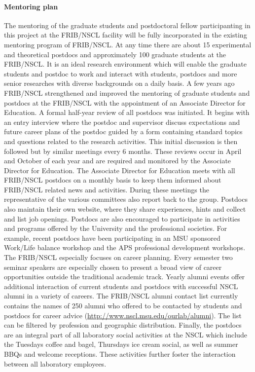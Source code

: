 \documentclass[10pt]{article}
\begin{document}
\paragraph{Mentoring plan}
The mentoring of the graduate students and postdoctoral fellow 
participanting in this project at the 
FRIB/NSCL facility will be fully incorporated in the existing
mentoring program of FRIB/NSCL. At any time there are about 15
experimental and theoretical postdocs and approximately 100 graduate
students at the FRIB/NSCL. It is an ideal research environment which
will enable the graduate students and postdoc to work and interact
with students, postdocs and more senior researches with diverse
backgrounds on a daily basis. A few years ago FRIB/NSCL strengthened
and improved the mentoring of graduate students and postdocs at the
FRIB/NSCL with the appointment of an Associate Director for
Education. A formal half-year review of all postdocs was initiated. It
begins with an entry interview where the postdoc and supervisor
discuss expectations and future career plans of the postdoc guided by
a form containing standard topics and questions related to the
research activities. This initial discussion is then followed but by
similar meetings every 6 months. These reviews occur in April and
October of each year and are required and monitored by the Associate
Director for Education.  The Associate Director for Education meets
with all FRIB/NSCL postdocs on a monthly basis to keep them informed
about FRIB/NSCL related news and activities. During these meetings the
representative of the various committees also report back to the
group. Postdocs also maintain their own website, where they share
experiences, hints and collect and list job openings. Postdocs are
also encouraged to participate in activities and programs offered by
the University and the professional societies. For example, recent
postdocs have been participating in an MSU sponsored Work/Life balance
workshop and the APS professional development workshops. The FRIB/NSCL
especially focuses on career planning. Every semester two seminar
speakers are especially chosen to present a broad view of career
opportunities outside the traditional academic track. Yearly alumni
events offer additional interaction of current students and postdocs
with successful NSCL alumni in a variety of careers.  The FRIB/NSCL
alumni contact list currently contains the names of 250 alumni who
offered to be contacted by students and postdocs for career advice
(\url{http://www.nscl.msu.edu/ourlab/alumni}).  The list can be
filtered by profession and geographic distribution.  Finally, the
postdocs are an integral part of all laboratory social activities at
the NSCL which include the Tuesdays coffee and bagel, Thursdays ice
cream social, as well as summer BBQs and welcome receptions. These
activities further foster the interaction between all laboratory
employees.
\end{document}

